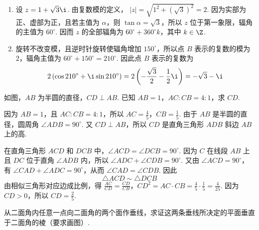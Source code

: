 \documentclass[UTF8,a4paper,oneside,11pt]{ctexbook}
\begin{document}
\begin{solution}
\begin{enumerate}
\item 设 \(z=1+\sqrt3\i\). 由复数模的定义，
\(|z|=\sqrt{1^2+\left(\sqrt3\right)^2}=2\).
因为实部为正、虚部为正，且若主值为 \(\alpha\)，则 \(\tan\alpha=\sqrt3\)，所以 \(z\) 位于第一象限，辐角的主值为 \(60^\circ\). 因而 \(z\) 的全部辐角为 \(60^\circ+360^\circ k\)，其中 \(k\in\Z\).

\item 旋转不改变模，且逆时针旋转使辐角增加 \(150^\circ\)，所以点 \(B\) 表示的复数的模为 \(2\)，辐角主值为
\(60^\circ+150^\circ=210^\circ\).
因此点 \(B\) 表示的复数为
\[
2\left(\cos210^\circ+\i\sin210^\circ\right)
=2\left(-\frac{\sqrt3}{2}-\frac12\i\right)
=-\sqrt3-\i
\]

\end{enumerate}
\end{solution}

\begin{problem}
如图，\(AB\) 为半圆的直径，\(CD\perp AB\). 已知 \(AB=1\)，\(AC:CB=4:1\)，求 \(CD\).

\end{problem}

\begin{solution}
因为 \(AB=1\)，且 \(AC:CB=4:1\)，所以 \(AC=\frac45\)，\(CB=\frac15\).
由于 \(AB\) 是半圆的直径，圆周角 \(\angle ADB=90^\circ\). 又 \(CD\perp AB\)，所以 \(CD\) 是直角三角形 \(ADB\) 斜边 \(AB\) 上的高.

在直角三角形 \(ACD\) 和 \(DCB\) 中，\(\angle ACD=\angle DCB=90^\circ\). 因为 \(C\) 在线段 \(AB\) 上且 \(DC\) 位于直角 \(\angle ADB\) 内，所以 \(\angle ADC+\angle CDB=90^\circ\). 又由 \(\angle ACD=90^\circ\)，有 \(\angle CAD+\angle ADC=90^\circ\)，从而 \(\angle CAD=\angle CDB\). 因此
\[
\triangle ACD\sim\triangle DCB
\]
由相似三角形对应边成比例，得
\(\frac{AC}{CD}=\frac{CD}{CB}\)，\(CD^2=AC\cdot CB =\frac45\cdot\frac15=\frac4{25}\).
因为 \(CD>0\)，所以 \(CD=\frac25\).

\end{solution}

\begin{problem}
从二面角内任意一点向二面角的两个面作垂线，求证这两条垂线所决定的平面垂直于二面角的棱（要求画图）.
\end{problem}
\end{document}
